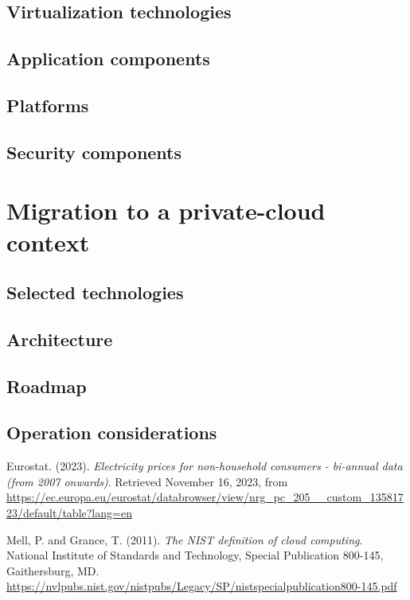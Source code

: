 \documentclass{llncs}
\begin{document}
\subsection{Virtualization technologies}


\subsection{Application components}

\subsection{Platforms}

\subsection{Security components}


\section{Migration to a private-cloud context}

\subsection{Selected technologies}

\subsection{Architecture}

\subsection{Roadmap}

\subsection{Operation considerations}


\begin{thebibliography}{5}
  
Eurostat. (2023). \textit{Electricity prices for non-household consumers - bi-annual data (from 2007 onwards)}. Retrieved November 16, 2023, from \url{https://ec.europa.eu/eurostat/databrowser/view/nrg_pc_205__custom_13581723/default/table?lang=en}

Mell, P. and Grance, T. (2011).
\emph{The NIST definition of cloud computing}.
National Institute of Standards and Technology, Special Publication 800-145, Gaithersburg, MD.
\url{https://nvlpubs.nist.gov/nistpubs/Legacy/SP/nistspecialpublication800-145.pdf} 

\end{thebibliography}
\end{document}
